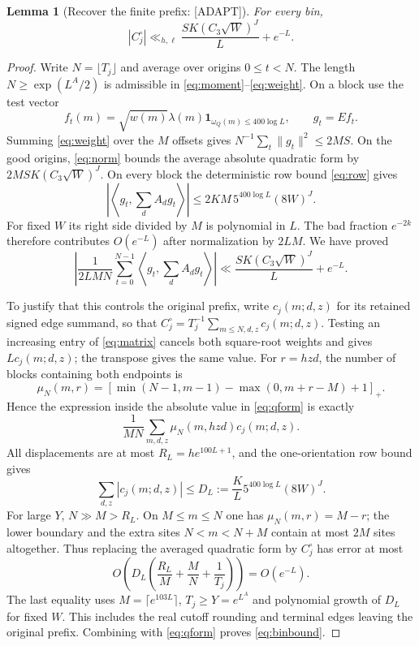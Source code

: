 \documentclass[11pt,a4paper]{article}
\numberwithin{equation}{section}
\newtheorem{lemma}[theorem]{Lemma}
\theoremstyle{remark}\newtheorem{remark}[theorem]{Remark}
\newcommand{\1}{\mathbf 1}
\begin{document}
\begin{lemma}[Recover the finite prefix: {\rm[ADAPT]}]
\label{lem:testing}
For every bin,
\begin{equation}\label{eq:binbound}
 |C_j^\circ|\ll_{h,\ell}\frac{SK(C_3\sqrt W)^J}{L}+e^{-L}.
\end{equation}
\end{lemma}
\begin{proof}
Write $N=\lfloor T_j\rfloor$ and average over origins $0\le t<N$.
The length $N\ge\exp(L^A/2)$ is admissible in
\eqref{eq:moment}--\eqref{eq:weight}. On a block use the test vector
\[
 f_t(m)=\sqrt{w(m)}\lambda(m)
              \1_{\omega_Q(m)\le400\log L},\qquad g_t=Ef_t.
\]
Summing \eqref{eq:weight} over the $M$ offsets gives
$N^{-1}\sum_t\|g_t\|^2\le2MS$. On the good origins,
\eqref{eq:norm} bounds the average absolute quadratic form by
$2MSK(C_3\sqrt W)^J$. On every block the deterministic row bound
\eqref{eq:row} gives
\[
 \left|\left\langle g_t,\sum_d A_dg_t\right\rangle\right|
 \le2KM\,5^{400\log L}(8W)^J.
\]
For fixed $W$ its right side divided by $M$ is polynomial in $L$.
The bad fraction $e^{-2k}$ therefore contributes $O(e^{-L})$
after normalization by $2LM$. We have proved
\begin{equation}\label{eq:qform}
 \left|\frac1{2LMN}\sum_{t=0}^{N-1}
 \left\langle g_t,\sum_d A_dg_t\right\rangle\right|
 \ll\frac{SK(C_3\sqrt W)^J}{L}+e^{-L}.
\end{equation}

To justify that this controls the original prefix, write
$c_j(m;d,z)$ for its retained signed edge summand, so that
$C_j^\circ=T_j^{-1}\sum_{m\le N,d,z}c_j(m;d,z)$.
Testing an increasing entry of \eqref{eq:matrix} cancels both square-root
weights and gives $L c_j(m;d,z)$; the transpose gives the same value.
For $r=hzd$, the number of blocks containing both endpoints is
\[
 \mu_N(m,r)=
 [\min(N-1,m-1)-\max(0,m+r-M)+1]_+.
\]
Hence the expression inside the absolute value in \eqref{eq:qform}
is exactly
\[
 \frac1{MN}\sum_{m,d,z}\mu_N(m,hzd)c_j(m;d,z).
\]
All displacements are at most $R_L=he^{100L+1}$, and the one-orientation
row bound gives
\[
 \sum_{d,z}|c_j(m;d,z)|\le
 D_L:=\frac KL5^{400\log L}(8W)^J.
\]
For large $Y$, $N\gg M>R_L$. On $M\le m\le N$ one has
$\mu_N(m,r)=M-r$; the lower boundary and the extra sites $N<m<N+M$
contain at most $2M$ sites altogether. Thus replacing the averaged
quadratic form by $C_j^\circ$ has error at most
\[
 O\left(D_L\left(\frac{R_L}{M}+\frac MN+\frac1{T_j}\right)\right)
 =O(e^{-L}).
\]
The last equality uses $M=\lceil e^{103L}\rceil$, $T_j\ge Y=e^{L^A}$
and polynomial growth of $D_L$ for fixed $W$. This includes the real
cutoff rounding and terminal edges leaving the original prefix.
Combining with \eqref{eq:qform} proves \eqref{eq:binbound}.
\end{proof}
\end{document}
